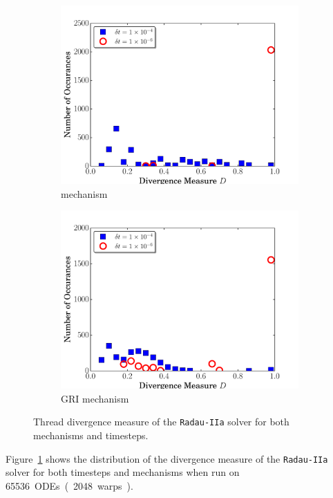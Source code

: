 \documentclass[preprint]{elsarticle}
\begin{document}
\begin{figure}[h]
  \centering
  \begin{subfigure}{0.49\textwidth}
      \includegraphics[width=\linewidth]{H2_radau2a_div.pdf}
      \caption{ mechanism}
  \end{subfigure}
  \begin{subfigure}{0.49\textwidth}
      \includegraphics[width=\linewidth]{CH4_radau2a_div.pdf}
      \caption{GRI mechanism}
  \end{subfigure}
  \caption{Thread divergence measure of the \texttt{Radau-IIa} solver for both mechanisms and timesteps.}
  \label{F:divergence}
\end{figure}
Figure~\ref{F:divergence} shows the distribution of the divergence measure of the \texttt{Radau-IIa} solver for both timesteps and mechanisms when run on \SI{65536} ODEs (\SI{2048} warps).
\end{document}
